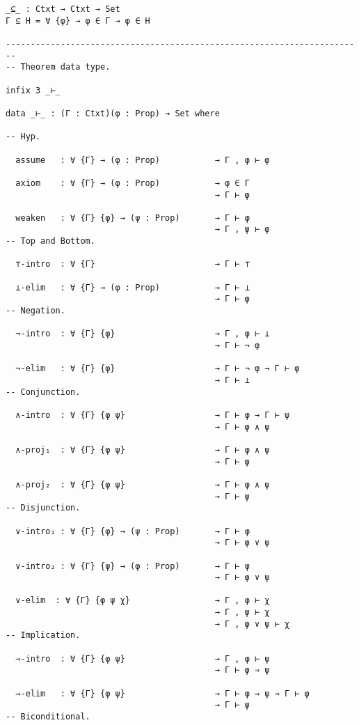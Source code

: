 \documentclass{article}
\begin{document}
\begin{listing}[ht]
\begin{verbatim}
_⊆_ : Ctxt → Ctxt → Set
Γ ⊆ Η = ∀ {φ} → φ ∈ Γ → φ ∈ Η

------------------------------------------------------------------------
-- Theorem data type.

infix 3 _⊢_

data _⊢_ : (Γ : Ctxt)(φ : Prop) → Set where

-- Hyp.

  assume   : ∀ {Γ} → (φ : Prop)           → Γ , φ ⊢ φ

  axiom    : ∀ {Γ} → (φ : Prop)           → φ ∈ Γ
                                          → Γ ⊢ φ

  weaken   : ∀ {Γ} {φ} → (ψ : Prop)       → Γ ⊢ φ
                                          → Γ , ψ ⊢ φ
-- Top and Bottom.

  ⊤-intro  : ∀ {Γ}                        → Γ ⊢ ⊤

  ⊥-elim   : ∀ {Γ} → (φ : Prop)           → Γ ⊢ ⊥
                                          → Γ ⊢ φ
-- Negation.

  ¬-intro  : ∀ {Γ} {φ}                    → Γ , φ ⊢ ⊥
                                          → Γ ⊢ ¬ φ

  ¬-elim   : ∀ {Γ} {φ}                    → Γ ⊢ ¬ φ → Γ ⊢ φ
                                          → Γ ⊢ ⊥
-- Conjunction.

  ∧-intro  : ∀ {Γ} {φ ψ}                  → Γ ⊢ φ → Γ ⊢ ψ
                                          → Γ ⊢ φ ∧ ψ

  ∧-proj₁  : ∀ {Γ} {φ ψ}                  → Γ ⊢ φ ∧ ψ
                                          → Γ ⊢ φ

  ∧-proj₂  : ∀ {Γ} {φ ψ}                  → Γ ⊢ φ ∧ ψ
                                          → Γ ⊢ ψ
-- Disjunction.

  ∨-intro₁ : ∀ {Γ} {φ} → (ψ : Prop)       → Γ ⊢ φ
                                          → Γ ⊢ φ ∨ ψ

  ∨-intro₂ : ∀ {Γ} {ψ} → (φ : Prop)       → Γ ⊢ ψ
                                          → Γ ⊢ φ ∨ ψ

  ∨-elim  : ∀ {Γ} {φ ψ χ}                 → Γ , φ ⊢ χ
                                          → Γ , ψ ⊢ χ
                                          → Γ , φ ∨ ψ ⊢ χ
-- Implication.

  ⇒-intro  : ∀ {Γ} {φ ψ}                  → Γ , φ ⊢ ψ
                                          → Γ ⊢ φ ⇒ ψ

  ⇒-elim   : ∀ {Γ} {φ ψ}                  → Γ ⊢ φ ⇒ ψ → Γ ⊢ φ
                                          → Γ ⊢ ψ
-- Biconditional.


\end{verbatim}
\end{listing}
\end{document}

